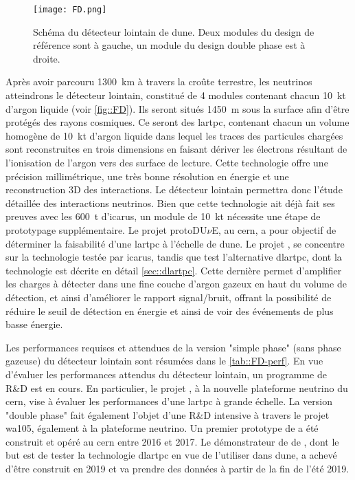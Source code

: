        \begin{figure}[htbp]
          \centering
          \texttt{[image: FD.png]}
          \caption[Schéma du détecteur lointain de DU$\nu$E]{\label{fig::FD}Schéma du détecteur lointain de \gls{dune}. Deux modules du design de référence sont à gauche, un module du design double phase est à droite.}
        \end{figure}
        Après avoir parcouru \SI{1300}{\kilo\meter} à travers la croûte terrestre, les neutrinos atteindrons le détecteur lointain, constitué de 4 modules contenant chacun \SI{10}{\kilo\tonne} d'argon liquide (voir \autoref{fig::FD}). Ils seront situés \SI{1450}{\meter} sous la surface afin d'être protégés des rayons cosmiques. Ce seront des \acrfull{lartpc}, contenant chacun un volume homogène de \SI{10}{\kilo\tonne} d'argon liquide dans lequel les traces des particules chargées sont reconstruites en trois dimensions en faisant dériver les électrons résultant de l'ionisation de l'argon vers des surface de lecture. Cette technologie offre une précision millimétrique, une très bonne résolution en énergie et une reconstruction 3D des interactions. Le détecteur lointain permettra donc l'étude détaillée des interactions neutrinos. Bien que cette technologie ait déjà fait ses preuves avec les \SI{600}{\tonne} d'\gls{icarus}, un module de \SI{10}{\kilo\tonne} nécessite une étape de prototypage supplémentaire. Le projet protoDU$\nu$E, au \gls{cern}, a pour objectif de déterminer la faisabilité d'une \gls{lartpc} à l'échelle de \gls{dune}. Le projet \protosp{}, se concentre sur la technologie testée par \gls{icarus}, tandis que \protodp{} test l'alternative \gls{dlartpc}, dont la technologie est décrite en détail \autoref{sec::dlartpc}. Cette dernière permet d'amplifier les charges à détecter dans une fine couche d'argon gazeux en haut du volume de détection, et ainsi d'améliorer le rapport signal/bruit, offrant la possibilité de réduire le seuil de détection en énergie et ainsi de voir des événements de plus basse énergie. 

        Les performances requises et attendues de la version "simple phase" (sans phase gazeuse) du détecteur lointain sont résumées dans le \autoref{tab::FD-perf}. En vue d'évaluer les performances attendus du détecteur lointain, un programme de R\&D est en cours. En particulier, le projet \protodp{}, à la nouvelle plateforme neutrino du \gls{cern}, vise à évaluer les performances d'une \gls{lartpc} à grande échelle. La version "double phase" fait également l'objet d'une R\&D intensive à travers le projet \gls{wa105}, également à la plateforme neutrino. Un premier prototype de \TOO{} a été construit et opéré au \gls{cern} entre 2016 et 2017. Le démonstrateur de \SSS{} de \protodp{}, dont le but est de tester la technologie \gls{dlartpc} en vue de l'utiliser dans \gls{dune}, a achevé d'être construit en 2019 et va prendre des données à partir de la fin de l'été 2019.


